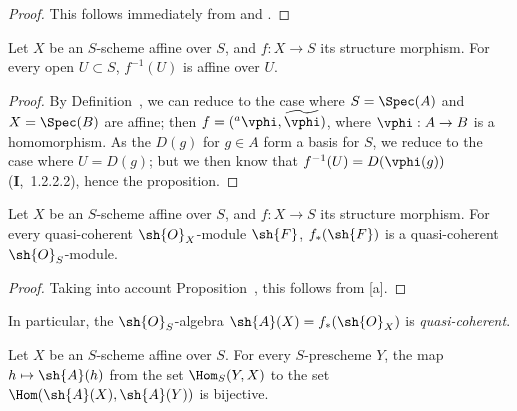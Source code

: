 \begin{proof}
This follows immediately from  and .
\end{proof}

\begin{proposition}[1.2.5]
\label{II.1.2.5}
Let $X$ be an $S$-scheme affine over $S$, and $f:X\to S$ its structure morphism.
For every open $U\subset S$, $f^{-1}(U)$ is affine over $U$.
\end{proposition}

\begin{proof}
By Definition~, we can reduce to the case where $S=\Spec(A)$ and $X=\Spec(B)$ are affine; then $f=({}^a\vphi,\widetilde{\vphi})$, where $\vphi:A\to B$ is a homomorphism.
As the $D(g)$ for $g\in A$ form a basis for $S$, we reduce to the case where $U=D(g)$; but we then know that $f^{-1}(U)=D(\vphi(g))$ (\textbf{I},~1.2.2.2), hence the proposition.
\end{proof}

\begin{proposition}[1.2.6]
\label{II.1.2.6}
Let $X$ be an $S$-scheme affine over $S$, and $f:X\to S$ its structure morphism.
For every quasi-coherent $\sh{O}_X$-module $\sh{F}$, $f_*(\sh{F})$ is a quasi-coherent $\sh{O}_S$-module.
\end{proposition}

\begin{proof}
Taking into account Proposition~, this follows from [a].
\end{proof}

In particular, the $\sh{O}_S$-algebra $\sh{A}(X)=f_*(\sh{O}_X)$ is \emph{quasi-coherent}.

\begin{proposition}[1.2.7]
\label{II.1.2.7}
Let $X$ be an $S$-scheme affine over $S$.
For every $S$-prescheme $Y$, the map $h\mapsto\sh{A}(h)$ from the set $\Hom_S(Y,X)$ to the set $\Hom(\sh{A}(X),\sh{A}(Y))$  is bijective.
\end{proposition}

